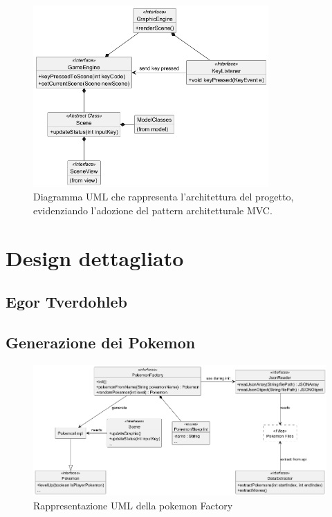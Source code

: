 \documentclass[a4paper,12pt]{report}
\begin{document}
{\begin{figure}[h]
\centering{}
\includegraphics[width=9cm]{immagini/architetturaMVC.png}
\caption{Diagramma UML che rappresenta l'architettura del progetto, evidenziando l'adozione del pattern architetturale MVC.}

\end{figure}






\section{Design dettagliato}


\subsection{Egor Tverdohleb}
\subsection*{Generazione dei Pokemon}
\begin{figure}[H]
\centering{}
\includegraphics[width=\textwidth]{immagini/pokemonFactory.png}
\caption{Rappresentazione UML della pokemon Factory}
\label{immagini/pokemonFactory}
\end{figure}
}
\end{document}
